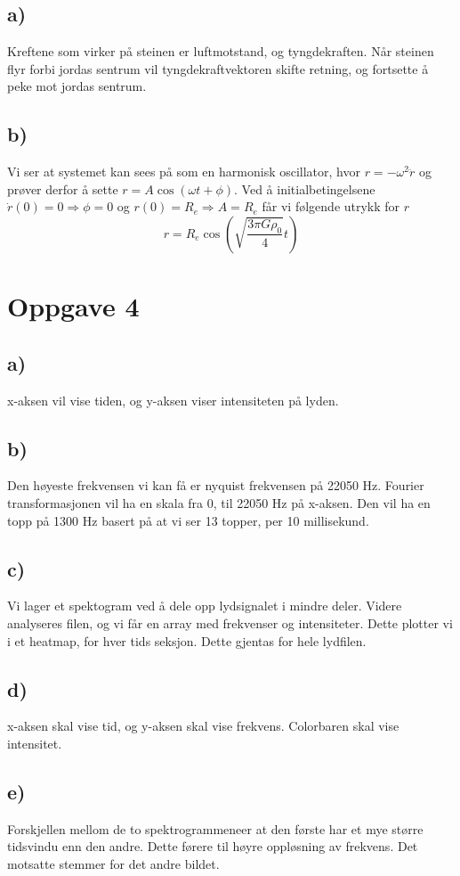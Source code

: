 \documentclass{article}
\begin{document}
\subsection*{a)}
Kreftene som virker på steinen er luftmotstand, og tyngdekraften. Når steinen flyr forbi jordas sentrum vil tyngdekraftvektoren skifte retning, og fortsette å peke mot jordas sentrum. 

\subsection*{b)}
Vi ser at systemet kan sees på som en harmonisk oscillator, hvor $r = -ω^2 \ddot{r}$ og prøver derfor å sette $r = A\cos (ωt + ϕ)$. Ved å initialbetingelsene $\dot{r}(0) = 0 ⇒ ϕ = 0$ og $r(0) = R_e ⇒ A = R_e$ får vi følgende utrykk for $r$
\[
r = R_e \cos \left(\sqrt{\frac{3πGρ_0}{4}}t\right)
\]




\section*{Oppgave 4}
\subsection*{a)}
x-aksen vil vise tiden, og y-aksen viser intensiteten på lyden. 

\subsection*{b)}
Den høyeste frekvensen vi kan få er nyquist frekvensen på 22050 Hz. Fourier transformasjonen vil ha en skala fra 0, til 22050 Hz på x-aksen. Den vil ha en topp på 1300 Hz basert på at vi ser 13 topper, per 10 millisekund. 

\subsection*{c)}
Vi lager et spektogram ved å dele opp lydsignalet i mindre deler. Videre analyseres filen, og vi får en array med frekvenser og intensiteter. Dette plotter vi i et heatmap, for hver tids seksjon. Dette gjentas for hele lydfilen. 

\subsection*{d)}
x-aksen skal vise tid, og y-aksen skal vise frekvens. Colorbaren skal vise intensitet. 

\subsection*{e)}
Forskjellen mellom de to spektrogrammeneer at den første har et mye større tidsvindu enn den andre. Dette førere til høyre oppløsning av frekvens. Det motsatte stemmer for det andre bildet. 


  
  
  
  
\end{document}
